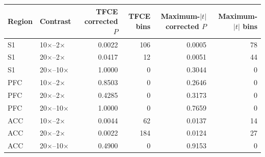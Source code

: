 \begin{tabular}{llrrrr}
\toprule
Region & Contrast & TFCE corrected $P$ & TFCE bins & Maximum-$|t|$ corrected $P$ & Maximum-$|t|$ bins \\
\midrule
S1 & 10$\times$--2$\times$ & 0.0022 & 106 & 0.0005 & 78 \\
S1 & 20$\times$--2$\times$ & 0.0417 & 12 & 0.0051 & 44 \\
S1 & 20$\times$--10$\times$ & 1.0000 & 0 & 0.3044 & 0 \\
PFC & 10$\times$--2$\times$ & 0.8503 & 0 & 0.2646 & 0 \\
PFC & 20$\times$--2$\times$ & 0.4285 & 0 & 0.3173 & 0 \\
PFC & 20$\times$--10$\times$ & 1.0000 & 0 & 0.7659 & 0 \\
ACC & 10$\times$--2$\times$ & 0.0044 & 62 & 0.0137 & 14 \\
ACC & 20$\times$--2$\times$ & 0.0022 & 184 & 0.0124 & 27 \\
ACC & 20$\times$--10$\times$ & 0.4900 & 0 & 0.9153 & 0 \\
\bottomrule
\end{tabular}
